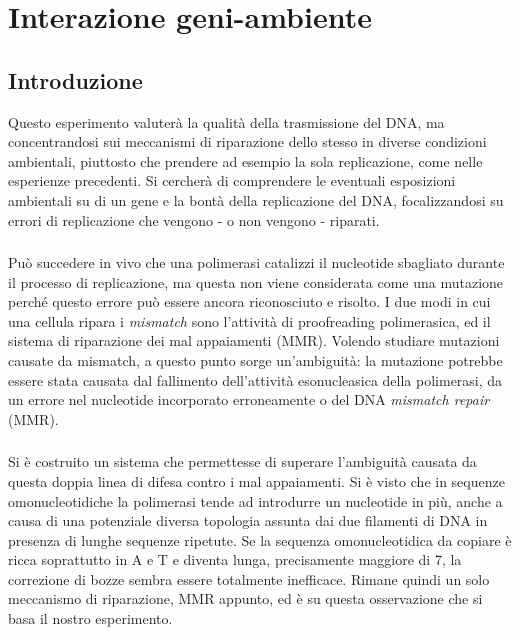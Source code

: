 \section*{Interazione geni-ambiente}
 \subsection{Introduzione}
 Questo esperimento valuterà la qualità della trasmissione del DNA, ma concentrandosi sui meccanismi di riparazione dello stesso in diverse condizioni ambientali, piuttosto che prendere ad esempio la sola replicazione, come nelle esperienze precedenti. Si cercherà di comprendere le eventuali esposizioni ambientali su di un gene e la bontà della replicazione del DNA, focalizzandosi su errori di replicazione che vengono - o non vengono - riparati. 
 
 \subsubsection{}
 Può succedere in vivo che una polimerasi catalizzi il nucleotide sbagliato durante il processo di replicazione, ma questa non viene considerata come una mutazione perché questo errore può essere ancora riconosciuto e risolto. I due modi in cui una cellula ripara i \textit{mismatch} sono l'attività di proofreading polimerasica, ed il sistema di riparazione dei mal appaiamenti (MMR). Volendo studiare mutazioni causate da mismatch, a questo punto sorge un'ambiguità: la mutazione potrebbe essere stata causata dal fallimento dell'attività esonucleasica della polimerasi, da un errore nel nucleotide incorporato erroneamente o del DNA \textit{mismatch repair} (MMR). 
 
 \subsubsection{}
 Si è costruito un sistema che permettesse di superare l'ambiguità causata da questa doppia linea di difesa contro i mal appaiamenti. Si è visto che in sequenze omonucleotidiche la polimerasi tende ad introdurre un nucleotide in più, anche a causa di una potenziale diversa topologia assunta dai due filamenti di DNA in presenza di lunghe sequenze ripetute. Se la sequenza omonucleotidica da copiare è ricca soprattutto in A e T e diventa lunga, precisamente maggiore di 7, la correzione di bozze sembra essere totalmente inefficace. Rimane quindi un solo meccanismo di riparazione, MMR appunto, ed è su questa osservazione che si basa il nostro esperimento. 
 
